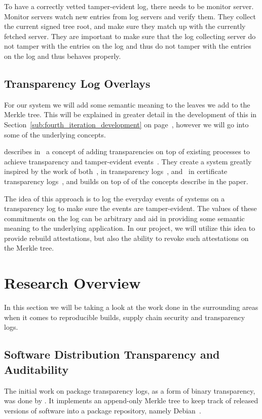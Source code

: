\documentclass[../Main/thesis.tex]{subfiles}
\begin{document}
To have a correctly vetted tamper-evident log, there needs to be monitor server.
Monitor servers watch new entries from log servers and verify them. They collect
the current signed tree root, and make sure they match up with the currently
fetched server. They are important to make sure that the log collecting server
do not tamper with the entries on the log and thus do not tamper with the
entries on the log and thus behaves properly.

\subsection*{Transparency Log Overlays}%
\label{sub:transparency_log_overlays}
For our system we will add some semantic meaning to the leaves we add to the
Merkle tree. This will be explained in greater detail in the development of
this in Section~\ref{sub:fourth_iteration_development} on
page~\pageref{sub:fourth_iteration_development}, however we will go into some of
the underlying concepts.

\citeauthor{10.11452976749.2978404} describes
in~ a concept of adding transparencies on top
of existing processes to achieve transparency and tamper-evident
events~\cite{10.11452976749.2978404}. They create a system greatly inspired by
the work of both~\citeauthor{182788}, in transparency logs~\cite{182788},
and~\citeauthor{b.-laurie-a.-langley-e.kaster-google-2013} in certificate
transparency logs~\cite{b.-laurie-a.-langley-e.kaster-google-2013}, and builds
on top of of the concepts describe in the paper.

The idea of this approach is to log the everyday events of systems on a
transparency log to make sure the events are tamper-evident. The values of these
commitments on the log can be arbitrary and aid in providing some semantic
meaning to the underlying application. In our project, we will utilize this idea
to provide rebuild attestations, but also the ability to revoke such attestations
on the Merkle tree.

\section{Research Overview}%
\label{sec:research_overview}
In this section we will be taking a look at the work done in the surrounding
areas when it comes to reproducible builds, supply chain security and
transparency logs.

\subsection{Software Distribution Transparency and Auditability}\label{sec:benjamin}
The initial work on package transparency logs, as a form of binary transparency,
was done by \citeauthor{1711.07278v1}. It implements an append-only Merkle tree to
keep track of released versions of software into a package repository, namely
Debian~\cite{1711.07278v1}.
\end{document}
